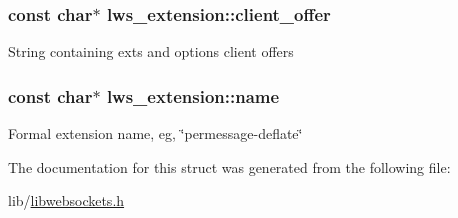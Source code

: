 \subsubsection[{\texorpdfstring{client\+\_\+offer}{client\_offer}}]{\setlength{\rightskip}{0pt plus 5cm}const char$\ast$ lws\+\_\+extension\+::client\+\_\+offer}\hypertarget{structlws__extension_a36b06c213aedb02bf9a402651751855b}{}\label{structlws__extension_a36b06c213aedb02bf9a402651751855b}
String containing exts and options client offers 
\subsubsection[{\texorpdfstring{name}{name}}]{\setlength{\rightskip}{0pt plus 5cm}const char$\ast$ lws\+\_\+extension\+::name}\hypertarget{structlws__extension_a1e5018c883d85176f5c2152176843f9e}{}\label{structlws__extension_a1e5018c883d85176f5c2152176843f9e}
Formal extension name, eg, \char`\"{}permessage-\/deflate\char`\"{} 

The documentation for this struct was generated from the following file\+:\begin{DoxyCompactItemize}
\item 
lib/\hyperlink{libwebsockets_8h}{libwebsockets.\+h}\end{DoxyCompactItemize}
